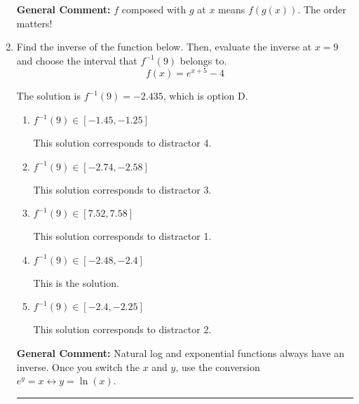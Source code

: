 \documentclass{extbook}[14pt]
\newcommand{\litem}[1]{\item #1

\rule{\textwidth}{0.4pt}}
\begin{document}
\begin{enumerate}
{\textbf{General Comment:} $f$ composed with $g$ at $x$ means $f(g(x))$. The order matters!
}
\litem{
Find the inverse of the function below. Then, evaluate the inverse at $x = 9$ and choose the interval that $f^{-1}(9)$ belongs to.
\[ f(x) = e^{x+5}-4 \]

The solution is \( f^{-1}(9) = -2.435 \), which is option D.\begin{enumerate}[label=\Alph*.]
\item \( f^{-1}(9) \in [-1.45, -1.25] \)

 This solution corresponds to distractor 4.
\item \( f^{-1}(9) \in [-2.74, -2.58] \)

 This solution corresponds to distractor 3.
\item \( f^{-1}(9) \in [7.52, 7.58] \)

 This solution corresponds to distractor 1.
\item \( f^{-1}(9) \in [-2.48, -2.4] \)

 This is the solution.
\item \( f^{-1}(9) \in [-2.4, -2.25] \)

 This solution corresponds to distractor 2.
\end{enumerate}

\textbf{General Comment:} Natural log and exponential functions always have an inverse. Once you switch the $x$ and $y$, use the conversion $ e^y = x \leftrightarrow y=\ln(x)$.
}
\end{enumerate}
\end{document}
